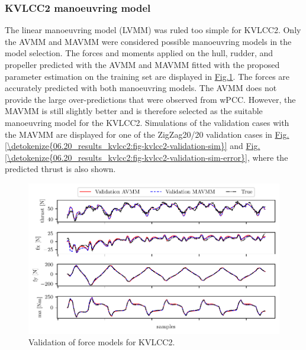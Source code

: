 \subsubsection{KVLCC2 manoeuvring model}
\label{\detokenize{06.20_results_kvlcc2:kvlcc2-manoeuvring-model}}
The linear manoeuvring model (LVMM) was ruled too simple for KVLCC2. Only the AVMM and MAVMM were considered possible manoeuvring models in the model selection.
The forces and moments applied on the hull, rudder, and propeller predicted with the AVMM and MAVMM fitted with the proposed parameter estimation on the training set are displayed in \hyperref[\detokenize{06.20_results_kvlcc2:fig-kvlcc2-validation-forces}]{Fig.\@ \ref{\detokenize{06.20_results_kvlcc2:fig-kvlcc2-validation-forces}}}.
The forces are accurately predicted with both manoeuvring models. The AVMM does not provide the large over-predictions that were observed from wPCC. However, the MAVMM is still slightly better and is therefore selected as the suitable manoeuvring model for the KVLCC2.
Simulations of the validation cases with the MAVMM are displayed for one of the ZigZag20/20 validation cases in \hyperref[\detokenize{06.20_results_kvlcc2:fig-kvlcc2-validation-sim}]{Fig.\@ \ref{\detokenize{06.20_results_kvlcc2:fig-kvlcc2-validation-sim}}} and \hyperref[\detokenize{06.20_results_kvlcc2:fig-kvlcc2-validation-sim-error}]{Fig.\@ \ref{\detokenize{06.20_results_kvlcc2:fig-kvlcc2-validation-sim-error}}}, where the predicted thrust is also shown.
\begin{figure}[h]
\centering
\includegraphics[width=1.0\textwidth]{kappa/images/14.pdf}
\caption{Validation of force models for KVLCC2.}\label{\detokenize{06.20_results_kvlcc2:fig-kvlcc2-validation-forces}}\end{figure}
